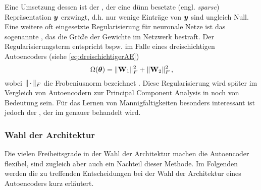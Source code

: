 Eine Umsetzung dessen ist der , der eine dünn besetzte (engl.
\textit{sparse}) Repräsentation $\bm{y}$ erzwingt, d.h. nur wenige Einträge von $\bm{y}$ sind
ungleich Null. Eine weitere oft eingesetzte Regularisierung für neuronale Netze ist das sogenannte
, das die Größe der Gewichte im Netzwerk bestraft. Der Regularisierungsterm
entspricht bspw. im Falle eines dreischichtigen Autoencoders (siehe \eqref{eq:dreischichtigerAE})
\begin{equation}
	\label{eq:WeightDecay}
	\Omega(\bm{\theta}) = \lVert\mathbf{W}_1\rVert^2_F + \lVert\mathbf{W}_2\rVert^2_F \, ,
\end{equation}
wobei $\lVert\,\cdot\,\rVert_F$ die Frobeniusnorm bezeichnet \parencite[1]{Kunin.2019}. Diese Regularisierung wird später im Vergleich von Autoencodern zur
Principal Component Analysis in  noch von Bedeutung
sein. Für das Lernen von Mannigfaltigkeiten besonders interessant ist jedoch der
 \parencite{Rifai.2011}, der im  genauer behandelt wird.

\subsubsection{Wahl der Architektur}
\label{ch:MethodenDerDimRed:ML:AE:WahlArchitektur}

Die vielen Freiheitsgrade in der Wahl der Architektur machen die Autoencoder flexibel, sind
zugleich aber auch ein Nachteil dieser Methode. Im Folgenden werden die zu treffenden
Entscheidungen bei der Wahl der Architektur eines Autoencoders kurz erläutert.

